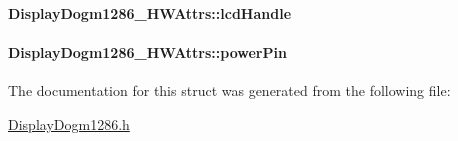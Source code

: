 \paragraph[{lcd\+Handle}]{ Display\+Dogm1286\+\_\+\+H\+W\+Attrs\+::lcd\+Handle}\label{struct_display_dogm1286___h_w_attrs_a5b7a6005271e6c9117a617e9c735ece1}
\paragraph[{power\+Pin}]{ Display\+Dogm1286\+\_\+\+H\+W\+Attrs\+::power\+Pin}\label{struct_display_dogm1286___h_w_attrs_a9949d110bdfbcab837d945a2e27dadd2}


The documentation for this struct was generated from the following file\+:\begin{DoxyCompactItemize}
\item 
\hyperlink{_display_dogm1286_8h}{Display\+Dogm1286.\+h}\end{DoxyCompactItemize}
